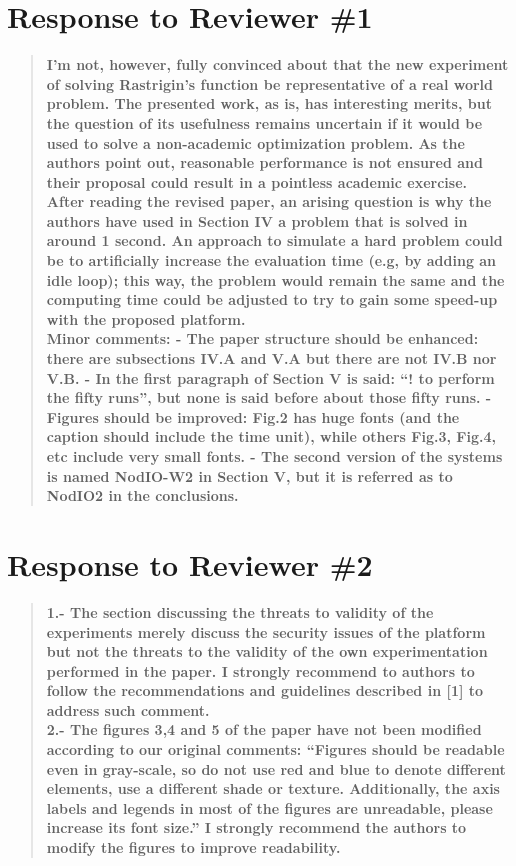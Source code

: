 \documentclass[preprint]{elsarticle}
\begin{document}
\section{Response to Reviewer \#1}


\begin{quote}
\textbf{I'm not, however, fully convinced about that the new experiment of solving Rastrigin's function be representative of a real world problem. The presented work, as is, has interesting merits, but the question of its usefulness remains uncertain if it would be used to solve a non-academic optimization problem. As the authors point out, reasonable performance is not ensured and their proposal could result in a pointless academic exercise.\\
After reading the revised paper, an arising question is why the authors have used in Section IV a problem that is solved in around 1 second. An approach to simulate a hard problem could be to artificially increase the evaluation time (e.g, by adding an idle loop); this way, the problem would remain the same and the computing time could be adjusted to try to gain some speed-up with the proposed platform.\\
Minor comments:
- The paper structure should be enhanced: there are subsections IV.A and V.A but there are not
IV.B nor V.B.
- In the first paragraph of Section V is said: ``! to perform the fifty runs'', but none is said before
about those fifty runs.
- Figures should be improved: Fig.2 has huge fonts (and the caption should include the time unit),
while others Fig.3, Fig.4, etc include very small fonts.
- The second version of the systems is named NodIO-W2 in Section V, but it is referred as to
NodIO2 in the conclusions.}
\end{quote}



\section{Response to Reviewer \#2}


\begin{quote}
\textbf{1.- The section discussing the threats to validity of the experiments merely discuss the security issues of the platform but not the threats to the validity of the own experimentation performed in the paper. I strongly recommend to authors to follow the recommendations and guidelines described in [1] to address such comment.\\
2.- The figures 3,4 and 5 of the paper have not been modified according to our original comments: ``Figures should be readable even in gray-scale, so do not use red and blue to denote different elements, use a different shade or texture. Additionally, the axis labels and legends in most of the figures are unreadable, please increase its font size.'' I strongly recommend the authors to modify the figures to improve readability.}
\end{quote}
\end{document}
